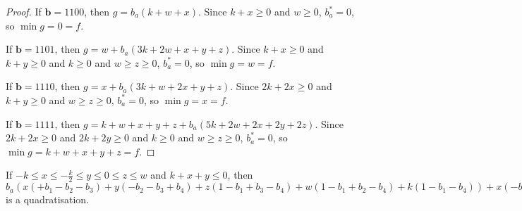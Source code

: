 \documentclass[11pt]{scrartcl}
\newcommand{\vc}[1]{\boldsymbol{#1}}
\begin{document}
\begin{proof}
If $\vc b = 1100$, then $g = b_a(k + w + x)$.
Since $k + x \ge 0$ and $w \ge 0$, $b_a^* = 0$, so $\min g = 0 = f$.

If $\vc b = 1101$, then $g = w + b_a(3k + 2w + x + y + z)$.
Since $k + x \ge 0 $ and $k + y \ge 0 $ and $k \ge 0 $ and $w \ge z \ge 0$, $b_a^* = 0$, so $\min g = w = f$.

If $\vc b = 1110$, then $g = x + b_a(3k + w + 2x + y + z)$.
Since $2k + 2x \ge 0$ and $k + y \ge 0$ and $w \ge z \ge 0$, $b_a^* = 0$, so $\min g = x = f$.

If $\vc b = 1111$, then $g = k + w + x + y + z + b_a(5k + 2w + 2x + 2y + 2z)$.
Since $2k + 2x \ge 0$ and $2k + 2y \ge 0$ and $k \ge 0$ and $w \ge z \ge 0$, $b_a^* = 0$, so $\min g = k + w + x + y + z = f$.

\end{proof}

\begin{lemma}
 If $-k\le x \le -\frac{k}{2} \le y \le 0 \le z \le w $ and $k + x + y \le 0$, then $b_a(x(+b_1-b_2-b_3)+y(-b_2-b_3+b_4)+z(1-b_1+b_3-b_4)+w(1-b_1+b_2-b_4)+k(1-b_1-b_4))+x(-b_1+b_1b_2+b_1b_3)+y(-b_4+b_2b_4+b_3b_4)+z(+b_1b_4)+w(+b_1b_4)+k(+b_1b_4)$ is a quadratisation.\\
 \end{lemma}
\end{document}
